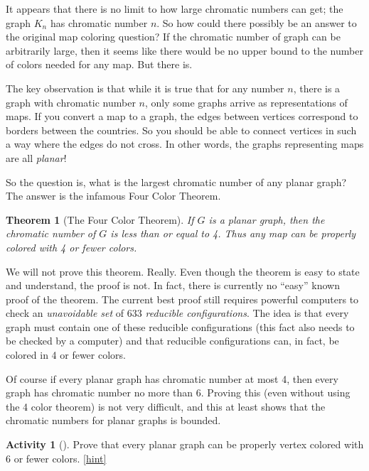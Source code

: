 \documentclass[10pt,]{book}
\theoremstyle{plain}
\newtheorem{theorem}{Theorem}[section]
\theoremstyle{definition}
\theoremstyle{definition}
\theoremstyle{definition}
\newtheorem{activity}[project]{Activity}
\numberwithin{equation}{chapter}
\begin{document}
\hypertarget{p-343}{}%
It appears that there is no limit to how large chromatic numbers can get; the graph \(K_n\) has chromatic number \(n\). So how could there possibly be an answer to the original map coloring question? If the chromatic number of graph can be arbitrarily large, then it seems like there would be no upper bound to the number of colors needed for any map. But there is.%
\par
\hypertarget{p-344}{}%
The key observation is that while it is true that for any number \(n\), there is a graph with chromatic number \(n\), only some graphs arrive as representations of maps. If you convert a map to a graph, the edges between vertices correspond to borders between the countries. So you should be able to connect vertices in such a way where the edges do not cross. In other words, the graphs representing maps are all \emph{planar}!%
\par
\hypertarget{p-345}{}%
So the question is, what is the largest chromatic number of any planar graph? The answer is the infamous Four Color Theorem.%
\begin{theorem}[{The Four Color Theorem}]\label{theorem-5}
\hypertarget{p-346}{}%
 If \(G\) is a planar graph, then the chromatic number of \(G\) is less than or equal to 4. Thus any map can be properly colored with 4 or fewer colors.%
\end{theorem}
\hypertarget{p-347}{}%
We will not prove this theorem. Really. Even though the theorem is easy to state and understand, the proof is not. In fact, there is currently no ``easy'' known proof of the theorem. The current best proof still requires powerful computers to check an \emph{unavoidable set} of 633 \emph{reducible configurations}. The idea is that every graph must contain one of these reducible configurations (this fact also needs to be checked by a computer) and that reducible configurations can, in fact, be colored in 4 or fewer colors.%
\par
\hypertarget{p-348}{}%
Of course if every planar graph has chromatic number at most 4, then every graph has chromatic number no more than 6.  Proving this (even without using the 4 color theorem) is not very difficult, and this at least shows that the chromatic numbers for planar graphs is bounded.%
\begin{activity}[]\label{activity-31}
\hypertarget{p-349}{}%
Prove that every planar graph can be properly vertex colored with 6 or fewer colors.%
\hfill{\tiny\hyperlink{a-38}{[hint]}\hypertarget{q-38}{}}\end{activity}
\end{document}
